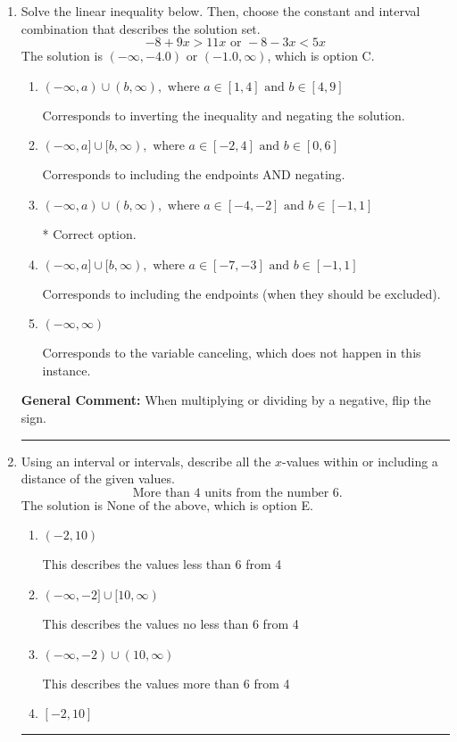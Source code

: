 \documentclass{extbook}[14pt]
\newcommand{\litem}[1]{\item #1

\rule{\textwidth}{0.4pt}}
\begin{document}
\begin{enumerate}\litem{
Solve the linear inequality below. Then, choose the constant and interval combination that describes the solution set.
\[ -8 + 9 x > 11 x \text{ or } -8 - 3 x < 5 x \]
The solution is \( (-\infty, -4.0) \text{ or } (-1.0, \infty) \), which is option C.\begin{enumerate}[label=\Alph*.]
\item \( (-\infty, a) \cup (b, \infty), \text{ where } a \in [1, 4] \text{ and } b \in [4, 9] \)

Corresponds to inverting the inequality and negating the solution.
\item \( (-\infty, a] \cup [b, \infty), \text{ where } a \in [-2, 4] \text{ and } b \in [0, 6] \)

Corresponds to including the endpoints AND negating.
\item \( (-\infty, a) \cup (b, \infty), \text{ where } a \in [-4, -2] \text{ and } b \in [-1, 1] \)

 * Correct option.
\item \( (-\infty, a] \cup [b, \infty), \text{ where } a \in [-7, -3] \text{ and } b \in [-1, 1] \)

Corresponds to including the endpoints (when they should be excluded).
\item \( (-\infty, \infty) \)

Corresponds to the variable canceling, which does not happen in this instance.
\end{enumerate}

\textbf{General Comment:} When multiplying or dividing by a negative, flip the sign.
}
\litem{
Using an interval or intervals, describe all the $x$-values within or including a distance of the given values.
\[ \text{ More than } 4 \text{ units from the number } 6. \]
The solution is \( \text{None of the above} \), which is option E.\begin{enumerate}[label=\Alph*.]
\item \( (-2, 10) \)

This describes the values less than 6 from 4
\item \( (-\infty, -2] \cup [10, \infty) \)

This describes the values no less than 6 from 4
\item \( (-\infty, -2) \cup (10, \infty) \)

This describes the values more than 6 from 4
\item \( [-2, 10] \)


\end{enumerate}}
\end{enumerate}
\end{document}
